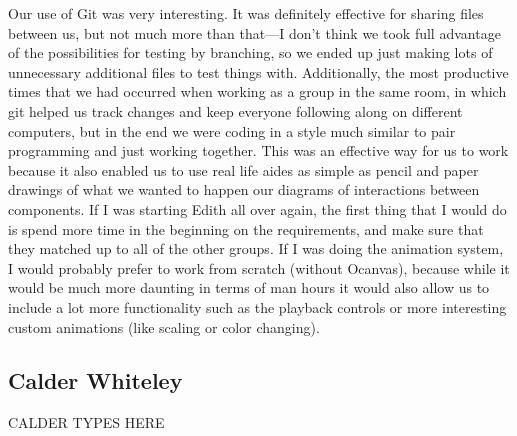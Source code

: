 \documentclass[12pt]{article}
\begin{document}
\begin{changemargin}{1cm}{0cm}
	Our use of Git was very interesting. It was definitely effective for sharing files between us, but not much more than that—I don’t think we took full advantage of the possibilities for testing by branching, so we ended up just making lots of unnecessary additional files to test things with. Additionally, the most productive times that we had occurred when working as a group in the same room, in which git helped us track changes and keep everyone following along on different computers, but in the end we were coding in a style much similar to pair programming and just working together. This was an effective way for us to work because it also enabled us to use real life aides as simple as pencil and paper drawings of what we wanted to happen our diagrams of interactions between components. 
	If I was starting Edith all over again, the first thing that I would do is spend more time in the beginning on the requirements, and make sure that they matched up to all of the other groups. If I was doing the animation system, I would probably prefer to work from scratch (without Ocanvas), because while it would be much more daunting in terms of man hours it would also allow us to include a lot more functionality such as the playback controls or more interesting custom animations (like scaling or color changing). 
\end{changemargin} 
\subsection{Calder Whiteley}
\begin{changemargin}{1cm}{0cm} 
CALDER TYPES HERE
\end{changemargin} 
\end{document}
